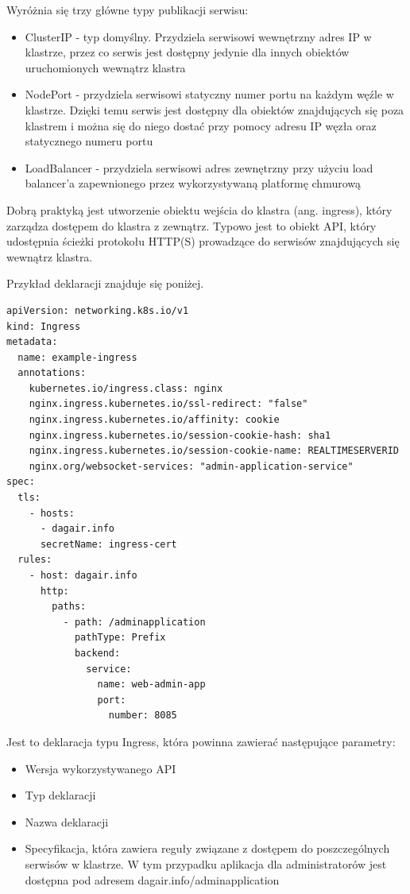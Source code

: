 \documentclass[11pt, a4]{article} %
\begin{document}
Wyróżnia się trzy główne typy publikacji serwisu:

\begin{itemize} %
    \item ClusterIP - typ domyślny. Przydziela serwisowi wewnętrzny adres IP 
    w klastrze, przez co serwis jest dostępny jedynie dla innych obiektów uruchomionych 
    wewnątrz klastra
    \item NodePort - przydziela serwisowi statyczny numer portu na każdym węźle 
    w klastrze. Dzięki temu serwis jest dostępny dla obiektów znajdujących się poza 
    klastrem i można się do niego dostać przy pomocy adresu IP węzła oraz statycznego 
    numeru portu
    \item LoadBalancer - przydziela serwisowi adres zewnętrzny przy użyciu load 
    balancer'a zapewnionego przez wykorzystywaną platformę chmurową
\end{itemize}

Dobrą praktyką jest utworzenie obiektu wejścia do klastra (ang. ingress), który 
zarządza dostępem do klastra z zewnątrz. Typowo jest to obiekt API, który udostępnia 
ścieżki protokołu HTTP(S) prowadzące do serwisów znajdujących się wewnątrz klastra.

Przykład deklaracji znajduje się poniżej.

\begin{lstlisting}
apiVersion: networking.k8s.io/v1
kind: Ingress
metadata:
  name: example-ingress
  annotations:
    kubernetes.io/ingress.class: nginx
    nginx.ingress.kubernetes.io/ssl-redirect: "false"
    nginx.ingress.kubernetes.io/affinity: cookie
    nginx.ingress.kubernetes.io/session-cookie-hash: sha1
    nginx.ingress.kubernetes.io/session-cookie-name: REALTIMESERVERID
    nginx.org/websocket-services: "admin-application-service"
spec:
  tls:
    - hosts:
      - dagair.info
      secretName: ingress-cert
  rules:
    - host: dagair.info
      http:
        paths:
          - path: /adminapplication
            pathType: Prefix
            backend:
              service:
                name: web-admin-app
                port:
                  number: 8085
\end{lstlisting}

Jest to deklaracja typu Ingress, która powinna zawierać następujące parametry:

\begin{itemize} %
    \item Wersja wykorzystywanego API
    \item Typ deklaracji
    \item Nazwa deklaracji
    \item Specyfikacja, która zawiera reguły związane z dostępem do poszczególnych 
    serwisów w klastrze. W tym przypadku aplikacja dla administratorów jest dostępna 
    pod adresem dagair.info/adminapplication
\end{itemize}
\end{document}
